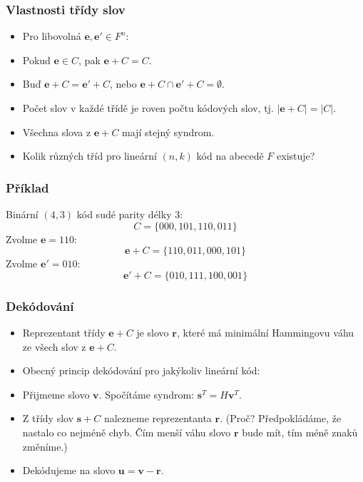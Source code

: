 \documentclass{beamer}
\newcommand{\vu}{\textbf{u}}
\newcommand{\vv}{\textbf{v}}
\newcommand{\e}{\textbf{e}}
\newcommand{\s}{\textbf{s}}
\newcommand{\vr}{\textbf{r}}
\newenvironment{itemizex}%
  {\large \begin{itemize}%
    \setlength{\itemsep}{8pt}%
    \setlength{\parskip}{8pt}}%
  {\end{itemize}}
\begin{document}
\begin{frame}[t,fragile]\frametitle{Vlastnosti třídy slov} 
    \begin{itemizex}
        \item Pro libovolná $\e, \e' \in F^n$:
        \item Pokud $\e\in C$, pak $\e+C=C$.
        \item Buď $\e+C=\e'+C$, nebo $\e+C\cap \e'+C=\emptyset$.
        \item Počet slov v každé třídě je roven počtu kódových slov, tj. $|\e+C|=|C|$.
        \item Všechna slova z $\e+C$ mají stejný syndrom.
        \item Kolik různých tříd pro lineární $(n,k)$ kód na abecedě $F$ existuje?
    \end{itemizex}
\end{frame}


\begin{frame}[t,fragile]\frametitle{Příklad} 
Binární $(4,3)$ kód sudé parity délky $3$:
$$
C=\{000, 101, 110, 011\}
$$
Zvolme $\e=110$:
$$
\e+C=\{110, 011, 000, 101\}
$$
Zvolme $\e'=010$:
$$
\e'+C=\{010, 111, 100, 001\}
$$
\end{frame}


\begin{frame}[t,fragile]\frametitle{Dekódování} 
    \begin{itemizex}
        \item Reprezentant třídy $\e+C$ je slovo $\vr$, které má minimální Hammingovu váhu ze všech slov z $\e+C$.
        \item Obecný princip dekódování pro jakýkoliv lineární kód:
        \item Přijmeme slovo $\vv$. Spočítáme syndrom: $\s^T=H\vv^T$.
        \item Z třídy slov $\s+C$ nalezneme reprezentanta $\vr$. (Proč? Předpokládáme, že nastalo co nejméně chyb. Čím menší váhu slovo $\vr$ bude mít, tím méně znaků změníme.)
        \item Dekódujeme na slovo $\vu=\vv-\vr$.
    \end{itemizex}
\end{frame}
\end{document}
